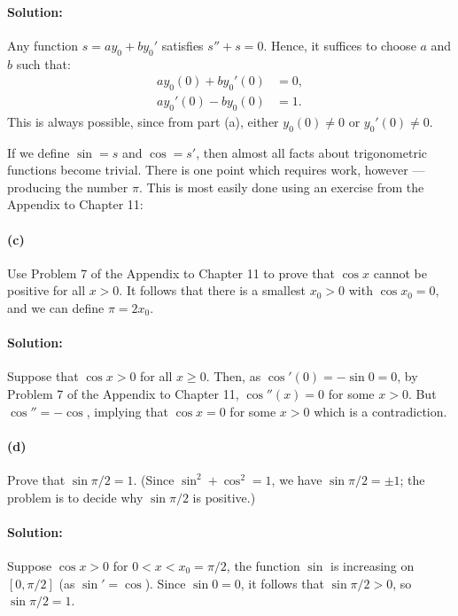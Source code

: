 \documentclass{article}
\begin{document}
\paragraph{Solution:} Any function $s = ay_0 + by_0'$ satisfies $s'' + s = 0$.
Hence, it suffices to choose $a$ and $b$ such that:
\begin{align*}
  ay_0(0) + by_0'(0) &= 0, \\
  ay_0'(0) - by_0(0) &= 1.
\end{align*} This is always possible, since from part (a), either $y_0(0) \neq
0$ or $y_0'(0) \neq 0$.

If we define $\sin = s$ and $\cos = s'$, then almost all facts about
trigonometric functions become trivial. There is one point which requires work,
however --- producing the number $\pi$. This is most easily done using an
exercise from the Appendix to Chapter 11:

\paragraph{(c)} Use Problem 7 of the Appendix to Chapter 11 to prove that $\cos
x$ cannot be positive for all $x > 0$. It follows that there is a smallest $x_0
> 0$ with $\cos x_0 = 0$, and we can define $\pi = 2x_0$.

\paragraph{Solution:} Suppose that $\cos x > 0$ for all $x \geq 0$. Then, as
$\cos'(0) = -\sin 0 = 0$, by Problem 7 of the Appendix to Chapter 11,
$\cos''(x) = 0$ for some $x > 0$. But $\cos'' = -\cos$, implying that $\cos
x = 0$ for some $x > 0$ which is a contradiction.

\paragraph{(d)} Prove that $\sin \pi/2 = 1$. (Since $\sin^2 + \cos^2 = 1$, we
have $\sin \pi/2 = \pm 1$; the problem is to decide why $\sin \pi/2$ is
positive.)

\paragraph{Solution:} Suppose $\cos x > 0$ for $0 < x < x_0 = \pi/2$, the
function $\sin$ is increasing on $[0, \pi/2]$ (as $\sin' = \cos$). Since
$\sin 0 = 0$, it follows that $\sin \pi/2 > 0$, so $\sin \pi/2 = 1$.
\end{document}
